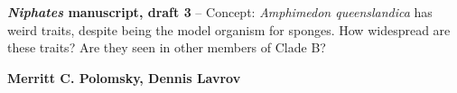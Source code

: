 \documentclass[../main.tex]{subfiles}
\begin{document}
\begin{titlepage}
   \begin{center}
       \vspace*{1cm}
        \huge
       \textbf{\emph{Niphates} manuscript, draft 3} -- Concept: \emph{Amphimedon queenslandica} has weird traits, despite being the model organism for sponges. How widespread are these traits? Are they seen in other members of Clade B?
       \vspace{2.0cm}
       
       \large
       \textbf{Merritt C. Polomsky, Dennis Lavrov}
       \vfill
       \vspace{0.8cm}
   \end{center}
\end{titlepage}
\end{document}
